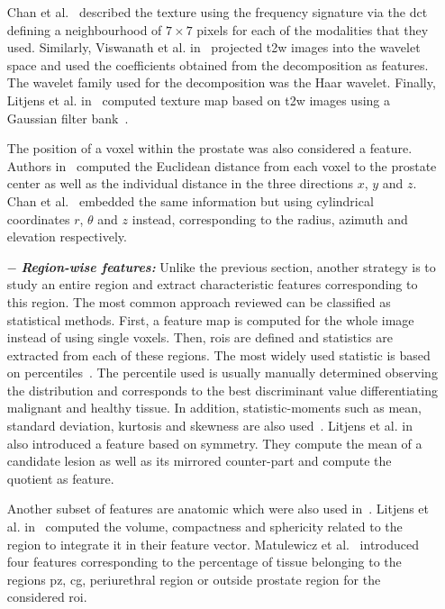 \begin{enumerate}[leftmargin=*]
Chan et al.~\cite{Chan2003} described the texture using the frequency signature via the \acf{dct}~\cite{Ahmed1974} defining a neighbourhood of $7 \times 7$ pixels for each of the modalities that they used.
  Similarly, Viswanath et al. in~\cite{Viswanath2012} projected \ac{t2w} images into the wavelet space and used the coefficients obtained from the decomposition as features. The wavelet family used for the decomposition was the Haar wavelet.
  Finally, Litjens et al. in~\cite{Litjens2014} computed texture map based on \ac{t2w} images using a Gaussian filter bank~\cite{Leung2001}.

  The position of a voxel within the prostate was also considered a feature. Authors in~\cite{Litjens2011,Litjens2014} computed the Euclidean distance from each voxel to the prostate center as well as the individual distance in the three directions $x$, $y$ and $z$. Chan et al.~\cite{Chan2003} embedded the same information but using cylindrical coordinates $r$, $\theta$ and $z$ instead, corresponding to the radius, azimuth and elevation respectively.

\item[$-$] \textbf{\textit{Region-wise features:}} Unlike the previous section, another strategy is to study an entire region and extract characteristic features corresponding to this region.
  The most common approach reviewed can be classified as statistical methods. First, a feature map is computed for the whole image instead of using single voxels. Then, \acp{roi} are defined and statistics are extracted from each of these regions. The most widely used statistic is based on percentiles~\cite{Antic2013,Litjens2011,Litjens2012,Litjens2014,Peng2013,Tiwari2009a,Tiwari2010,Tiwari2013,Viswanath2008,Viswanath2008a,Viswanath2011,Viswanath2012,Vos2008,Vos2008a,Vos2010,Vos2012}. The percentile used is usually manually determined observing the distribution and corresponds to the best discriminant value differentiating malignant and healthy tissue. In addition, statistic-moments such as mean, standard deviation, kurtosis and skewness are also used~\cite{Ampeliotis2007,Ampeliotis2008,Antic2013,Niaf2011,Niaf2012,Peng2013}. Litjens et al. in~\cite{Litjens2014} also introduced a feature based on symmetry. They compute the mean of a candidate lesion as well as its mirrored counter-part and compute the quotient as feature.

  Another subset of features are anatomic which were also used in~\cite{Litjens2012,Litjens2014,Matulewicz2013}. Litjens et al. in~\cite{Litjens2012,Litjens2014} computed the volume, compactness and sphericity related to the region to integrate it in their feature vector. Matulewicz et al.~\cite{Matulewicz2013} introduced four features corresponding to the percentage of tissue belonging to the regions \ac{pz}, \ac{cg}, periurethral region or outside prostate region for the considered \ac{roi}.


\end{enumerate}
